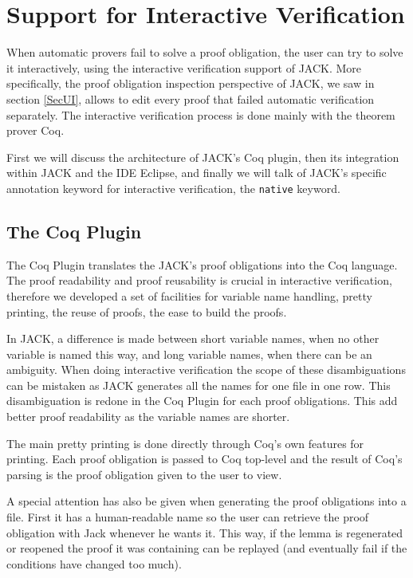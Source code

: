 


\section{Support for Interactive Verification}\label{SecInteractive}
When automatic provers fail to solve a proof obligation,
the user can try to solve it interactively, using the interactive verification
support of JACK.
More specifically, the proof obligation inspection 
perspective of JACK, we saw in section
\ref{SecUI}, allows to edit every proof that 
failed automatic verification separately.
The interactive verification process is done mainly
with the theorem prover Coq. 

First we will discuss the architecture of JACK's Coq plugin, then its 
integration within JACK and the IDE Eclipse, and finally we will talk of
 JACK's specific annotation keyword for interactive verification, the 
{\tt native} keyword. 

\subsection{The Coq Plugin}
The Coq Plugin translates the JACK's proof obligations
into the Coq language.
The proof readability and proof reusability is crucial in interactive 
verification,
therefore we developed a set of facilities for variable name handling,
pretty printing, the reuse of proofs, the ease to build the proofs.

In JACK, a difference is made between short variable names, 
when no other variable is named this way,
 and long variable names, when there can be an ambiguity. 
When doing interactive verification the scope of these disambiguations 
can be mistaken as JACK generates all the names for one file in one row.
This disambiguation is redone in the Coq Plugin for each proof obligations.
This add better proof readability as the variable names are shorter.

The main pretty printing is done directly through Coq's own features for
 printing. Each proof obligation is passed to Coq top-level and the result of 
Coq's parsing is the proof obligation given to the user to view.


A special attention has also be given when generating the proof obligations 
into a file. First it has a human-readable name so the user can retrieve 
the proof obligation with Jack whenever he wants it. 
This way, if the lemma is regenerated or reopened
 the proof it was containing can be replayed 
(and eventually fail if the conditions have changed too much).

